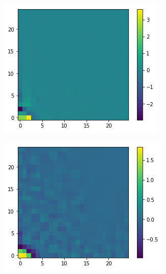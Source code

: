 \documentclass[11pt]{article}
\begin{document}
\begin{figure}[h]
	\centering
	\begin{subfigure}{0.3\textwidth}
		\centering
		\includegraphics[width=\textwidth]{ising_images/logreg_2d_2019}
	\end{subfigure}
	\begin{subfigure}{0.3\textwidth}
		\centering
		\includegraphics[width=\textwidth]{ising_images/logreg_2d_ising}
	\end{subfigure}
	\begin{subfigure}{0.3\textwidth}

\end{subfigure}
\end{figure}
\end{document}
